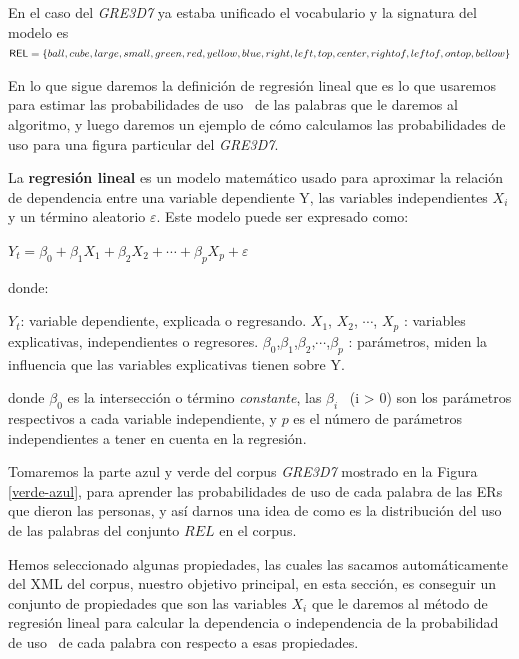 En el caso del \textit{GRE3D7} ya estaba unificado el vocabulario y la signatura del modelo es 
$\textsf{REL} = \{ball, cube, large, small, green, red, yellow, blue, right, left, top, center, rightof, leftof, ontop, bellow\} $

En lo que sigue daremos la definici\'on de regresi\'on lineal que es lo que usaremos para estimar las probabilidades de uso \puse\ de las palabras que le daremos al algoritmo, y luego daremos un ejemplo de c\'omo calculamos las probabilidades de uso para una figura particular del \textit{GRE3D7}.

La \textbf{regresi\'on lineal} es un modelo matem\'atico usado para aproximar la relaci\'on de dependencia entre una variable dependiente Y, las variables independientes $X_i$ y un t\'ermino aleatorio $\varepsilon$. Este modelo puede ser expresado como:

    $Y_t = \beta_0 + \beta_1 X_1 + \beta_2 X_2 + \cdots +\beta_p X_p + \varepsilon$

donde:

    $Y_t$: variable dependiente, explicada o regresando.
    $X_1$, $X_2$, $\cdots$, $X_p$ : variables explicativas, independientes o regresores.
    $\beta_0$,$\beta_1$,$\beta_2$,$\cdots$,$\beta_p$ : par\'ametros, miden la influencia que las variables explicativas tienen sobre Y.

donde $\beta_0$ es la intersecci\'on o t\'ermino {\it constante}, las $\beta_i$ \ (i > 0) son los par\'ametros respectivos a cada variable independiente, y $p$ es el n\'umero de par\'ametros independientes a tener en cuenta en la regresi\'on.

Tomaremos la parte azul y verde del corpus \textit{GRE3D7} mostrado en la Figura \ref{verde-azul}, para aprender las probabilidades de uso de cada palabra de las ERs que dieron las personas, y as\'i darnos una idea de como es la distribuci\'on del uso de las palabras del conjunto $REL$ en el corpus.

Hemos seleccionado algunas propiedades, las cuales las sacamos autom\'aticamente del XML del corpus, nuestro objetivo principal, en esta secci\'on, es conseguir un conjunto de propiedades que son las variables $X_i$ que le daremos al m\'etodo de regresi\'on lineal para calcular la dependencia o independencia de la probabilidad de uso \puse\ de cada palabra con respecto a esas propiedades.

